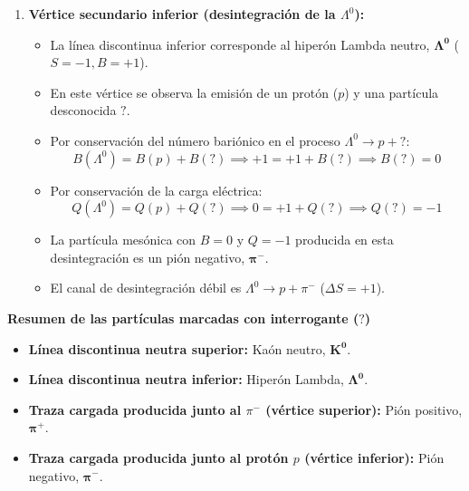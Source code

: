 \begin{problema}
\begin{enumerate}[label=\arabic*.]
    \item \textbf{Vértice secundario inferior (desintegración de la $\Lambda^0$):}
    \begin{itemize}
        \item La línea discontinua inferior corresponde al hiperón Lambda neutro, $\boldsymbol{\Lambda^0}$ ($S = -1, B = +1$).
        \item En este vértice se observa la emisión de un protón ($p$) y una partícula desconocida $\mathbf{?}$.
        \item Por conservación del número bariónico en el proceso $\Lambda^0 \to p + \mathbf{?}$:
        \begin{equation*}
            B(\Lambda^0) = B(p) + B(\mathbf{?}) \implies +1 = +1 + B(\mathbf{?}) \implies B(\mathbf{?}) = 0
        \end{equation*}
        \item Por conservación de la carga eléctrica:
        \begin{equation*}
            Q(\Lambda^0) = Q(p) + Q(\mathbf{?}) \implies 0 = +1 + Q(\mathbf{?}) \implies Q(\mathbf{?}) = -1
        \end{equation*}
        \item La partícula mesónica con $B = 0$ y $Q = -1$ producida en esta desintegración es un pión negativo, $\boldsymbol{\pi^-}$.
        \item El canal de desintegración débil es $\Lambda^0 \to p + \pi^-$ ($\Delta S = +1$).
    \end{itemize}
\end{enumerate}

\textbf{Resumen de las partículas marcadas con interrogante ($\mathbf{?}$)}

\begin{itemize}
    \item \textbf{Línea discontinua neutra superior:} Kaón neutro, $\mathbf{K^0}$.
    \item \textbf{Línea discontinua neutra inferior:} Hiperón Lambda, $\boldsymbol{\Lambda^0}$.
    \item \textbf{Traza cargada producida junto al $\pi^-$ (vértice superior):} Pión positivo, $\boldsymbol{\pi^+}$.
    \item \textbf{Traza cargada producida junto al protón $p$ (vértice inferior):} Pión negativo, $\boldsymbol{\pi^-}$.
\end{itemize}
\end{problema}

